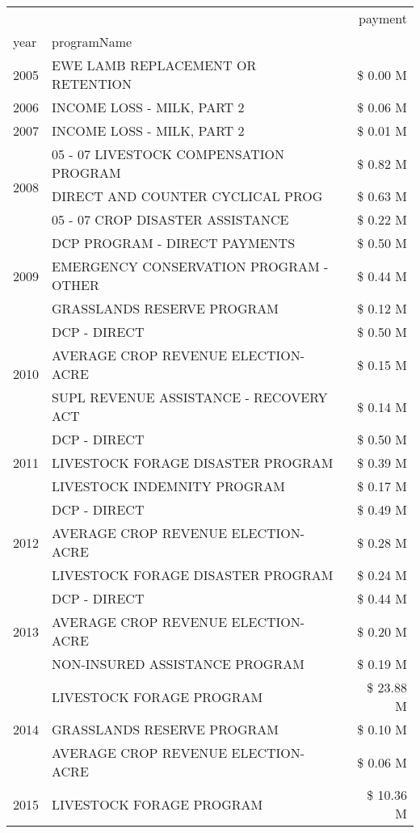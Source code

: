 \begin{tabular}{llr}
\toprule
 &  & payment \\
year & programName &  \\
\midrule
2005 & EWE LAMB REPLACEMENT OR RETENTION & \$ 0.00 M \\
\cline{1-3}
2006 & INCOME LOSS - MILK, PART 2 & \$ 0.06 M \\
\cline{1-3}
2007 & INCOME LOSS - MILK, PART 2 & \$ 0.01 M \\
\cline{1-3}
\multirow[t]{3}{*}{2008} & 05 - 07 LIVESTOCK COMPENSATION PROGRAM & \$ 0.82 M \\
 & DIRECT AND COUNTER CYCLICAL PROG & \$ 0.63 M \\
 & 05 - 07 CROP DISASTER ASSISTANCE & \$ 0.22 M \\
\cline{1-3}
\multirow[t]{3}{*}{2009} & DCP PROGRAM - DIRECT PAYMENTS & \$ 0.50 M \\
 & EMERGENCY CONSERVATION PROGRAM - OTHER & \$ 0.44 M \\
 & GRASSLANDS RESERVE PROGRAM & \$ 0.12 M \\
\cline{1-3}
\multirow[t]{3}{*}{2010} & DCP - DIRECT & \$ 0.50 M \\
 & AVERAGE CROP REVENUE ELECTION-ACRE & \$ 0.15 M \\
 & SUPL REVENUE ASSISTANCE - RECOVERY ACT & \$ 0.14 M \\
\cline{1-3}
\multirow[t]{3}{*}{2011} & DCP - DIRECT & \$ 0.50 M \\
 & LIVESTOCK FORAGE DISASTER PROGRAM & \$ 0.39 M \\
 & LIVESTOCK INDEMNITY PROGRAM & \$ 0.17 M \\
\cline{1-3}
\multirow[t]{3}{*}{2012} & DCP - DIRECT & \$ 0.49 M \\
 & AVERAGE CROP REVENUE ELECTION-ACRE & \$ 0.28 M \\
 & LIVESTOCK FORAGE DISASTER PROGRAM & \$ 0.24 M \\
\cline{1-3}
\multirow[t]{3}{*}{2013} & DCP - DIRECT & \$ 0.44 M \\
 & AVERAGE CROP REVENUE ELECTION-ACRE & \$ 0.20 M \\
 & NON-INSURED ASSISTANCE PROGRAM & \$ 0.19 M \\
\cline{1-3}
\multirow[t]{3}{*}{2014} & LIVESTOCK FORAGE PROGRAM & \$ 23.88 M \\
 & GRASSLANDS RESERVE PROGRAM & \$ 0.10 M \\
 & AVERAGE CROP REVENUE ELECTION-ACRE & \$ 0.06 M \\
\cline{1-3}
\multirow[t]{3}{*}{2015} & LIVESTOCK FORAGE PROGRAM & \$ 10.36 M \\

\end{tabular}
